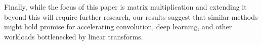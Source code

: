 \documentclass{article}  %
\begin{document}
Finally, while the focus of this paper is matrix multiplication and extending it beyond this will require further research, our results suggest that similar methods might hold promise for accelerating convolution, deep learning, and other workloads bottlenecked by linear transforms.








\end{document}
